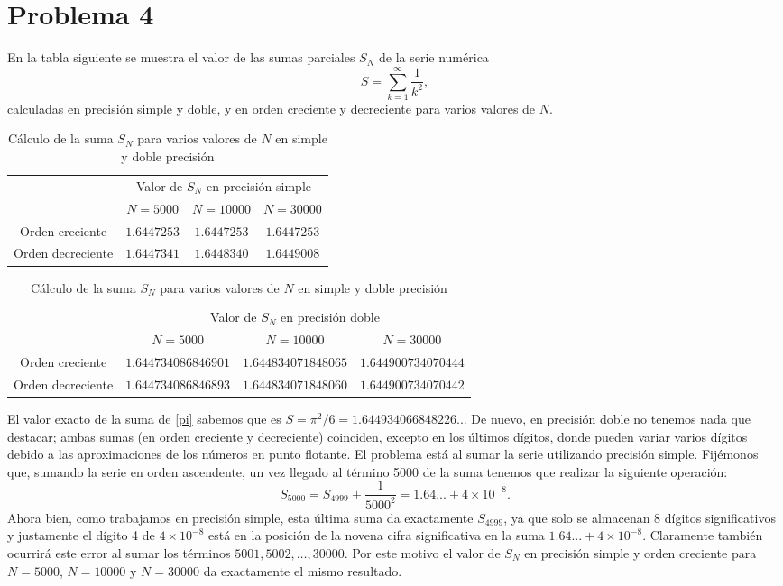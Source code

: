 \documentclass[a4paper]{article}
\begin{document}
\section*{Problema 4}
En la tabla siguiente se muestra el valor de las sumas parciales $S_N$ de la serie numérica 
\begin{equation}
    S=\sum_{k=1}^\infty\frac{1}{k^2},
    \label{pi}
\end{equation} calculadas en precisión simple y doble, y en orden creciente y decreciente para varios valores de $N$.\par
\begin{table}[ht]
	\centering
	\begin{tabular}{|c|c|c|c|}
	    \hline
	    & \multicolumn{3}{c|}{Valor de $S_N$ en precisión simple} \\
		\cline{2-4} 
		& $N=5000$ & $N=10000$ & $N=30000$\\
		\hline
		Orden creciente  & $1.6447253$ & $1.6447253$ & $1.6447253$ \\
		\hline
		Orden decreciente  & $1.6447341$ & $1.6448340$  & $1.6449008$ \\
		\hline
	\end{tabular}\vspace{5pt}
	\begin{tabular}{|c|c|c|c|}
	\hline
	    & \multicolumn{3}{c|}{Valor de $S_N$ en precisión doble}\\
		\cline{2-4} 
		& $N=5000$ & $N=10000$ & $N=30000$ \\
		\hline
		Orden creciente & $1.644734086846901$ & $1.644834071848065$ & $1.644900734070444$ \\
		\hline
		Orden decreciente & $1.644734086846893$ & $1.644834071848060$ & $1.644900734070442$\\
		\hline
	\end{tabular}
		\caption{Cálculo de la suma $S_N$ para varios valores de $N$ en simple y doble precisión}
		\label{tab:4}
	\end{table}
El valor exacto de la suma de \eqref{pi} sabemos que es $S=\pi^2/6=1.644934066848226...$ De nuevo, en precisión doble no tenemos nada que destacar; ambas sumas (en orden creciente y decreciente) coinciden, excepto en los últimos dígitos, donde pueden variar varios dígitos debido a las aproximaciones de los números en punto flotante. El problema está al sumar la serie utilizando precisión simple. Fijémonos que, sumando la serie en orden ascendente, un vez llegado al término 5000 de la suma tenemos que realizar la siguiente operación: $$S_{5000}=S_{4999}+\frac{1}{5000^2}=1.64...+4\times10^{-8}.$$ Ahora bien, como trabajamos en precisión simple, esta última suma da exactamente $S_{4999}$, ya que solo se almacenan 8 dígitos significativos y justamente el dígito 4 de $4\times10^{-8}$ está en la posición de la novena cifra significativa en la suma $1.64...+4\times10^{-8}$. Claramente también ocurrirá este error al sumar los términos $5001,5002,\ldots,30000$. Por este motivo el valor de $S_N$ en precisión simple y orden creciente para $N=5000$, $N=10000$ y $N=30000$ da exactamente el mismo resultado.\par 
\end{document}

